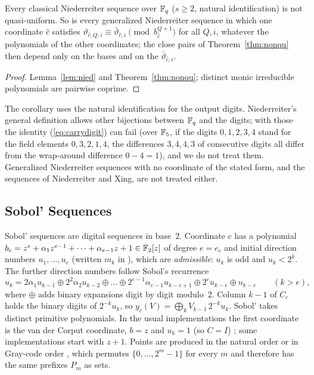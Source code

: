 \begin{corollary}\label{cor:nied}
Every classical Niederreiter sequence over $\mathbb{F}_q$ ($s\ge2$, natural identification) is not quasi-uniform. So is every generalized Niederreiter sequence in which one coordinate $\hat c$ satisfies $\vartheta_{\hat c,Q,i}\equiv\bar\vartheta_{\hat c,i}\pmod{b_{\hat c}^{Q+1}}$ for all $Q,i$, whatever the polynomials of the other coordinates; the close pairs of Theorem~\ref{thm:nonqu} then depend only on the bases and on the $\bar\vartheta_{\hat c,i}$.
\end{corollary}

\begin{proof}
Lemma~\ref{lem:nied} and Theorem~\ref{thm:nonqu}; distinct monic irreducible polynomials are pairwise coprime.
\end{proof}

The corollary uses the natural identification for the output digits. Niederreiter's general definition allows other bijections between $\mathbb{F}_q$ and the digits; with those the identity (\ref{eq:carrydigit}) can fail (over $\mathbb{F}_5$, if the digits $0,1,2,3,4$ stand for the field elements $0,3,2,1,4$, the differences $3,4,4,3$ of consecutive digits all differ from the wrap-around difference $0-4=1$), and we do not treat them. Generalized Niederreiter sequences with no coordinate of the stated form, and the sequences of Niederreiter and Xing, are not treated either.

\subsection{Sobol' Sequences}
Sobol' sequences \cite{Sob67} are digital sequences in base~$2$. Coordinate $c$ has a polynomial $b_c=z^e+\alpha_1z^{e-1}+\dots+\alpha_{e-1}z+1\in\mathbb{F}_2[z]$ of degree $e=e_c$ and initial direction numbers $u_1,\dots,u_e$ (written $m_k$ in \cite{Sob67}), which are \emph{admissible}: $u_k$ is odd and $u_k<2^k$. The further direction numbers follow Sobol's recurrence
\begin{equation}\label{eq:sobrec}
u_k=2\alpha_1u_{k-1}\oplus2^2\alpha_2u_{k-2}\oplus\dots\oplus2^{e-1}\alpha_{e-1}u_{k-e+1}\oplus2^eu_{k-e}\oplus u_{k-e}\qquad(k>e),
\end{equation}
where $\oplus$ adds binary expansions digit by digit modulo~$2$. Column $k-1$ of $C_c$ holds the binary digits of $2^{-k}u_k$, so $y_c(V)=\bigoplus_kV_{k-1}\,2^{-k}u_k$. Sobol' takes distinct primitive polynomials. In the usual implementations the first coordinate is the van der Corput coordinate, $b=z$ and $u_k=1$ (so $C=I$) \cite{BF88,JK08}; some implementations start with $z+1$. Points are produced in the natural order or in Gray-code order \cite{AS79}, which permutes $\{0,\dots,2^m-1\}$ for every $m$ and therefore has the same prefixes $P_m$ as sets.

